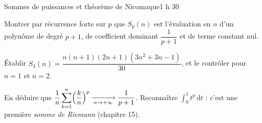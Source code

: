 \begin{defi}{Sommes de puissances et théorème de Nicomaque}{1 h 30}
\begin{questions}[resume]
  \item Montrer par récurrence forte sur $p$ que $S_p(n)$ est l'évaluation
    en $n$ d'un polynôme de degré $p+1$, de coefficient dominant
    $\dfrac{1}{p+1}$ et de terme constant nul.
  \item Établir $S_4(n)=\dfrac{n(n+1)(2n+1)(3n^{2}+3n-1)}{30}$, et le
    contrôler pour $n=1$ et $n=2$.
  \item En déduire que
    $\dfrac{1}{n}\displaystyle\sum_{k=1}^{n}\Bigl(\frac kn\Bigr)^{p}
    \xrightarrow[n\to+\infty]{}\dfrac{1}{p+1}$. Reconnaître
    $\displaystyle\int_{0}^{1}t^{p}\,\mathrm{d}t$ : c'est une première
    \emph{somme de Riemann} (chapitre 15).
\end{questions}
\end{defi}
